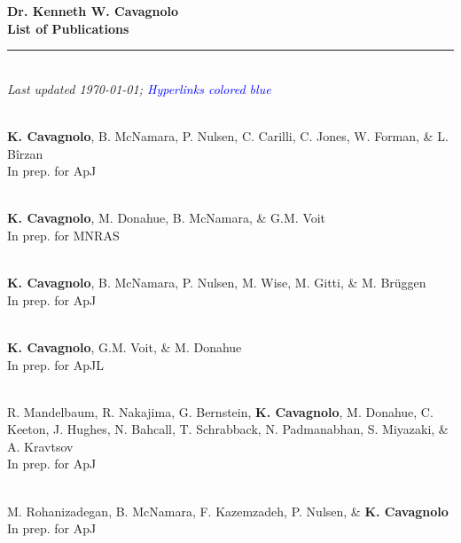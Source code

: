 \documentclass[12pt]{cv}
\begin{document}
\begin{center}
{\large \textbf{Dr. Kenneth W. Cavagnolo\\List of Publications}}\\
\rule{17.35cm}{2pt}\\
\footnotesize
{\it Last updated \today; \textcolor{blue}{Hyperlinks colored blue}}
\normalsize
\end{center}

\begin{llist}



{}\\
{\bf K. Cavagnolo}, B. McNamara, P. Nulsen, C. Carilli, C. Jones, W. Forman,
\& L. B\^irzan\\
In prep. for ApJ

{}\\
{\bf K. Cavagnolo}, M. Donahue, B. McNamara, \& G.M. Voit\\
In prep. for MNRAS

{}\\
{\bf K. Cavagnolo}, B. McNamara, P. Nulsen, M. Wise, M. Gitti, \& M. Br\"uggen\\
In prep. for ApJ

{}\\
{\bf K. Cavagnolo}, G.M. Voit, \& M. Donahue\\
In prep. for ApJL

{}\\
R. Mandelbaum, R. Nakajima, G. Bernstein, {\bf K. Cavagnolo}, M. Donahue, C. Keeton, J. Hughes, N. Bahcall, T. Schrabback, N. Padmanabhan, S. Miyazaki, \& A. Kravtsov\\
In prep. for ApJ

{}\\
M. Rohanizadegan, B. McNamara, F. Kazemzadeh, P. Nulsen, \& {\bf K. Cavagnolo}\\
In prep. for ApJ


\end{llist}
\end{document}
